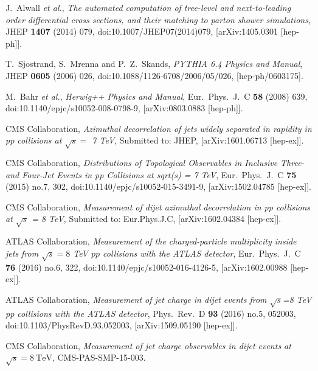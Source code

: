 \documentclass{PoS}
\begin{document}
\begin{thebibliography}{99}
  J.~Alwall {\it et al.},
  {\it The automated computation of tree-level and next-to-leading order differential cross sections, and their matching to parton shower simulations},
  JHEP {\bf 1407} (2014) 079,
  doi:10.1007/JHEP07(2014)079,
  [arXiv:1405.0301 [hep-ph]].

  T.~Sjostrand, S.~Mrenna and P.~Z.~Skands,
  {\it PYTHIA 6.4 Physics and Manual},
  JHEP {\bf 0605} (2006) 026,
  doi:10.1088/1126-6708/2006/05/026,
  [hep-ph/0603175].

  M.~Bahr {\it et al.},
  {\it Herwig++ Physics and Manual},
  Eur.\ Phys.\ J.\ C {\bf 58} (2008) 639,
  doi:10.1140/epjc/s10052-008-0798-9,
  [arXiv:0803.0883 [hep-ph]].

  CMS Collaboration,
  {\it Azimuthal decorrelation of jets widely separated in rapidity in pp collisions at $\sqrt{s} =$ 7 TeV},
  Submitted to: JHEP,
  [arXiv:1601.06713 [hep-ex]].

  CMS Collaboration,
  {\it Distributions of Topological Observables in Inclusive Three- and Four-Jet Events in pp Collisions at sqrt(s) = 7 TeV},
  Eur.\ Phys.\ J.\ C {\bf 75} (2015) no.7,  302,
  doi:10.1140/epjc/s10052-015-3491-9,
  [arXiv:1502.04785 [hep-ex]].

  CMS Collaboration,
  {\it Measurement of dijet azimuthal decorrelation in pp collisions at $\sqrt{s}$ = 8 TeV},
  Submitted to: Eur.Phys.J.C,
  [arXiv:1602.04384 [hep-ex]].

  ATLAS Collaboration,
  {\it Measurement of the charged-particle multiplicity inside jets from $\sqrt{s}=8$ TeV $pp$ collisions with the ATLAS detector},
  Eur.\ Phys.\ J.\ C {\bf 76} (2016) no.6,  322,
  doi:10.1140/epjc/s10052-016-4126-5,
  [arXiv:1602.00988 [hep-ex]].

  ATLAS Collaboration,
  {\it Measurement of jet charge in dijet events from $\sqrt{s}$=8 TeV pp collisions with the ATLAS detector},
  Phys.\ Rev.\ D {\bf 93} (2016) no.5,  052003,
  doi:10.1103/PhysRevD.93.052003,
  [arXiv:1509.05190 [hep-ex]].

  CMS Collaboration,
  {\it Measurement of jet charge observables in dijet events at $\sqrt{s}=8~\mathrm{TeV}$},
  CMS-PAS-SMP-15-003.


\end{thebibliography}
\end{document}
